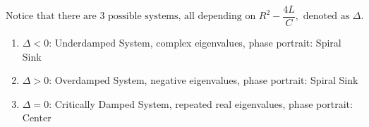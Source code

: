 \documentclass[preview]{standalone}
\begin{document}
\begin{center}
\[\text{Notice that there are 3 possible systems, all depending on } 
                    R^2 - \frac{4L}{C}, \text{ denoted as } \Delta.\]
                    \begin{enumerate}
                        \item $\Delta < 0$: Underdamped System, complex eigenvalues, phase portrait: Spiral Sink
                        \item $\Delta > 0$: Overdamped System, negative eigenvalues, phase portrait: Spiral Sink
                        \item $\Delta = 0$: Critically Damped System, repeated real eigenvalues, phase portrait: Center
                    \end{enumerate}
\end{center}
\end{document}
